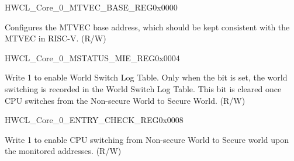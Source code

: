 \begin{register}{H}{WCL\_Core\_0\_MTVEC\_BASE\_REG}{0x0000}\label{regdesc:WCLCORE0MTVECBASEREG}
%
\regnewline%
\begin{regdesc}\begin{reglist}
\label{fielddesc:WCLCORE0MTVECBASE}\item [WCL\_CORE\_0\_MTVEC\_BASE] Configures the MTVEC base address, which should be kept consistent with the MTVEC in RISC-V. (R/W)
\end{reglist}\end{regdesc}
\end{register}


\begin{register}{H}{WCL\_Core\_0\_MSTATUS\_MIE\_REG}{0x0004}\label{regdesc:WCLCORE0MSTATUSMIEREG}
%
%
\regnewline%
\begin{regdesc}\begin{reglist}
\label{fielddesc:WCLCORE0MSTATUSMIE}\item [WCL\_CORE\_0\_MSTATUS\_MIE] Write 1 to enable World Switch Log Table. Only when the bit is set, the world switching is recorded in the World Switch Log Table. This bit is cleared once CPU switches from the Non-secure World to Secure World.  (R/W)
\end{reglist}\end{regdesc}
\end{register}


\begin{register}{H}{WCL\_Core\_0\_ENTRY\_CHECK\_REG}{0x0008}\label{regdesc:WCLCORE0ENTRYCHECKREG}
%
\regnewline%
\begin{regdesc}\begin{reglist}
\label{fielddesc:WCLCORE0ENTRYCHECK}\item [WCL\_CORE\_0\_ENTRY\_CHECK] Write 1 to enable CPU switching from Non-secure World to Secure world upon the monitored addresses. (R/W)
\end{reglist}\end{regdesc}
\end{register}










